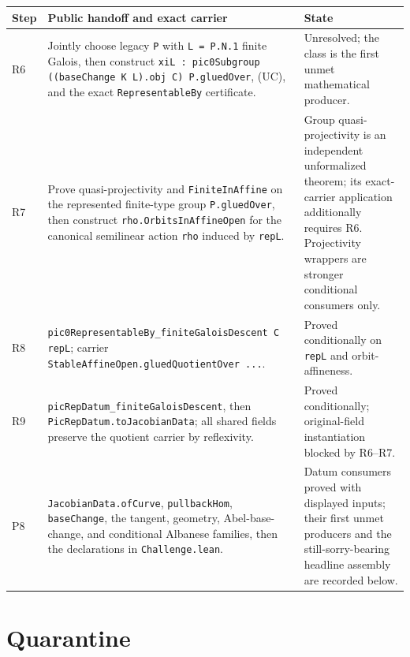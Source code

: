 \begin{center}
\begin{tabular}{p{}p{}p{}}
\textbf{Step} & \textbf{Public handoff and exact carrier} & \textbf{State}\\ \hline
R6 & Jointly choose legacy \texttt{P} with \texttt{L = P.N.1} finite Galois,
then construct
\texttt{xiL : pic0Subgroup ((baseChange K L).obj C) P.gluedOver}, (UC), and
the exact \texttt{RepresentableBy} certificate. & Unresolved; the class is the
first unmet mathematical producer.\\
R7 & Prove quasi-projectivity and \texttt{FiniteInAffine} on the represented
finite-type group \texttt{P.gluedOver}, then construct
\texttt{rho.OrbitsInAffineOpen} for the canonical semilinear action
\texttt{rho} induced by \texttt{repL}. & Group quasi-projectivity is an independent unformalized
theorem; its exact-carrier application additionally requires R6.
Projectivity wrappers are stronger conditional consumers only.\\
R8 & \texttt{pic0RepresentableBy\_finiteGaloisDescent C repL}; carrier
\texttt{StableAffineOpen.gluedQuotientOver ...}. & Proved conditionally on
\texttt{repL} and orbit-affineness.\\
R9 & \texttt{picRepDatum\_finiteGaloisDescent}, then
\texttt{PicRepDatum.toJacobianData}; all shared fields preserve the quotient
carrier by reflexivity. & Proved conditionally; original-field instantiation
blocked by R6--R7.\\
P8 & \texttt{JacobianData.ofCurve}, \texttt{pullbackHom},
\texttt{baseChange}, the tangent, geometry, Abel-base-change, and conditional
Albanese families, then the declarations in \texttt{Challenge.lean}. & Datum
consumers proved with displayed inputs; their first unmet producers and the
still-sorry-bearing headline assembly are recorded below.\\
\end{tabular}
\end{center}

\section{Quarantine}

